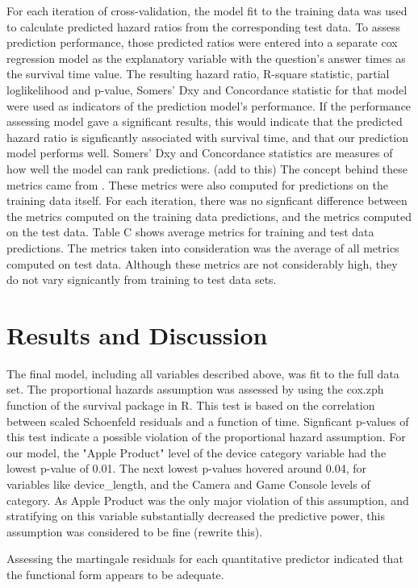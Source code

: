 \documentclass[12pt]{article}
\begin{document}
For each iteration of cross-validation, the model fit to the training data was used to calculate predicted hazard ratios from the corresponding test data. To assess prediction performance, those predicted ratios were entered into a separate cox regression model as the explanatory variable with the question's answer times as the survival time value. The resulting hazard ratio, R-square statistic, partial loglikelihood and p-value, Somers' Dxy and Concordance statistic for that model were used as indicators of the prediction model's performance. If the performance assessing model gave a significant results, this would indicate that the predicted hazard ratio is signficantly associated with survival time, and that our prediction model performs well. Somers' Dxy and Concordance statistics are measures of how well the model can rank predictions. (add to this) The concept behind these metrics came from \cite{Chen}. These metrics were also computed for predictions on the training data itself. For each iteration, there was no signficant difference between the metrics computed on the training data predictions, and the metrics computed on the test data. Table C shows average metrics for training and test data predictions. The metrics taken into consideration was the average of all metrics computed on test data. Although these metrics are not considerably high, they do not vary signicantly from training to test data sets.  

\section{Results and Discussion} 

The final model, including all variables described above, was fit to the full data set.
The proportional hazards assumption was assessed by using the cox.zph function of the survival package in R. This test is based on the correlation between scaled Schoenfeld residuals and a function of time. Signficant p-values of this test indicate a possible violation of the proportional hazard assumption. For our model, the "Apple Product" level of the device category variable had the lowest p-value of 0.01. The next lowest p-values hovered around 0.04, for variables like device_length, and the Camera and Game Console levels of category. As Apple Product was the only major violation of this assumption, and stratifying on this variable substantially decreased the predictive power, this assumption was considered to be fine (rewrite this). 

Assessing the martingale residuals for each quantitative predictor indicated that the functional form appears to be adequate.
\end{document}
